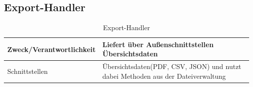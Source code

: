 \subsection{Export-Handler}
\begin{table}[th]
	\begin{tabularx}{\textwidth}{p{5cm} X}
		\hline
		Zweck/Verantwortlichkeit & Liefert über Außenschnittstellen Übersichtsdaten \\
		\hline
		Schnittstellen & Übersichtsdaten(PDF, CSV, JSON) und nutzt dabei Methoden aus der Dateiverwaltung\\
		\hline
	\end{tabularx} 
	\caption{Export-Handler}
	\label{tab:ExportHandler}
\end{table}
